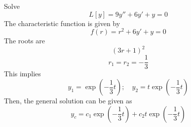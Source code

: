 \documentclass[diffeq.tex]{subfiles}
\begin{document}
\np
\begin{example}
    Solve
    \begin{equation}
        L[y] = 9y'' + 6y' + y = 0
    \end{equation}
    The characteristic function is given by
    \begin{equation}
        f(r) = r^{2} + 6y' + y = 0
    \end{equation}
    The roots are
    \begin{equation}
        (3r + 1)^{2}
    \end{equation}
    \begin{equation}
        r_{1} = r_{2} = -\frac{1}{3}
    \end{equation}
    This implies
    \begin{equation}
        y_{1} = \exp(-\frac{1}{3}t);\quad y_{2} = t\exp(-\frac{1}{3}t)
    \end{equation}
    Then, the general solution can be given as
    \begin{equation}
        y_{c} = c_{1}\exp(-\frac{1}{3}t) + c_{2}t\exp(-\frac{1}{3}t)
    \end{equation}
\end{example}
\end{document}
